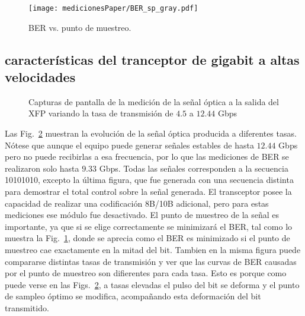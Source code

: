 \begin{figure}[t]
  \centering
    \texttt{[image: medicionesPaper/BER\_sp\_gray.pdf]}
\caption {BER vs. punto de muestreo.}
\label{fig:BERvsSamplingPoint}
\end{figure}

\subsection{características del tranceptor de gigabit a altas velocidades}


\begin{figure}[!t]
   \centering
   \qquad
   \qquad
   \qquad
   \qquad
   \qquad
  \caption {Capturas de pantalla de la medición de la señal óptica a la salida del XFP variando la tasa de transmisión de $4.5$ a $12.44$ Gbps}
  \label{fig:ImgTasa}
\end{figure}





Las Fig.~\ref{fig:ImgTasa} muestran la evolución de la señal óptica producida a diferentes
tasas. Nótese que aunque el equipo puede generar señales estables de
hasta $12.44$ Gbps pero no puede recibirlas a esa frecuencia, por lo que las
mediciones de BER se realizaron solo hasta $9.33$ Gbps. Todas las señales
corresponden a la secuencia 10101010, excepto la última figura,
que fue generada con una secuencia distinta para demostrar el total
control sobre la señal generada. El transceptor posee la capacidad de
realizar una codificación 8B/10B adicional, pero para estas mediciones
ese módulo fue desactivado.
El punto de muestreo de la señal es importante, ya que si se elige correctamente se minimizará el BER, tal como lo muestra la Fig.~\ref{fig:BERvsSamplingPoint}, donde se aprecia como el BER es minimizado si el punto de muestreo cae exactamente en la mitad del bit. Tambien en la misma figura puede compararse distintas tasas de transmisión y ver que las curvas de BER causadas por el punto de muestreo son difierentes para cada tasa. Esto es porque como puede verse en las Figs.~\ref{fig:ImgTasa}, a tasas elevadas el pulso del bit se deforma y el punto de sampleo óptimo se modifica, acompañando esta deformación del bit transmitido.


